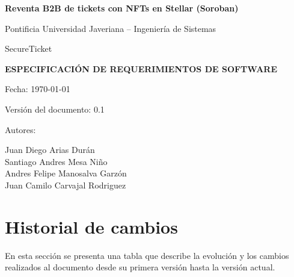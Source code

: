 \documentclass[12pt,letterpaper]{article}
\newcommand{\nombreProyecto}{Reventa B2B de tickets con NFTs en Stellar (Soroban)}
\newcommand{\nombreEmpresa}{SecureTicket}
\newcommand{\universidad}{Pontificia Universidad Javeriana -- Ingeniería de Sistemas}
\newcommand{\versionDoc}{0.1}
\begin{document}
\begin{titlepage}
    \centering
    \vspace*{1cm}
    
    {\Large \textbf{\nombreProyecto}\par}
    \vspace{0.5cm}
    {\large \universidad\par}
    \vspace{0.5cm}
    {\large \nombreEmpresa\par}
    
    \vspace{2cm}
    {\LARGE \textbf{ESPECIFICACIÓN DE REQUERIMIENTOS DE SOFTWARE}\par}
    
    \vspace{1.5cm}
    {\large Fecha: \today\par}
    {\large Versión del documento: \versionDoc\par}
    
    \vspace{2cm}
    
    \vfill
    {\large Autores:\par}
    {\large Juan Diego Arias Durán\\
    Santiago Andres Mesa Niño\\
    Andres Felipe Manosalva Garzón\\
    Juan Camilo Carvajal Rodriguez\par}
    
    \vspace{1cm}
\end{titlepage}

\section*{Historial de cambios}

En esta sección se presenta una tabla que describe la evolución y los cambios
realizados al documento desde su primera versión hasta la versión actual.
\end{document}
